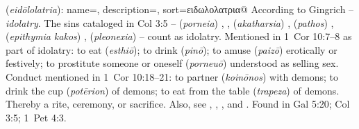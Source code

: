 \item[Idolatry,]

(\textit{eidōlolatria}):
{
    name=,
    description={},
    sort=ειδωλολατρια@
}
According to Gingrich -- \emph{idolatry}. The sins cataloged in Col 3:5 --  (\emph{porneia}) , , (\emph{akatharsia}) ,  (\emph{pathos}) ,  (\emph{epithymia kakos}) ,  (\emph{pleonexia})  -- count as idolatry. Mentioned in 1~Cor 10:7--8 as part of idolatry: to eat  (\emph{esthiō}); to drink  (\emph{pinō}); to amuse  (\emph{paizō}) erotically or festively; to prostitute someone or oneself  (\emph{porneuō}) understood as selling sex. Conduct mentioned in 1~Cor 10:18--21: to partner  (\emph{koinōnos}) with demons; to drink the cup  (\emph{potērion}) of demons; to eat from the table  (\emph{trapeza}) of demons. Thereby a rite, ceremony, or sacrifice. Also, see  , , , and .
Found in Gal 5:20; Col 3:5; 1~Pet 4:3.
